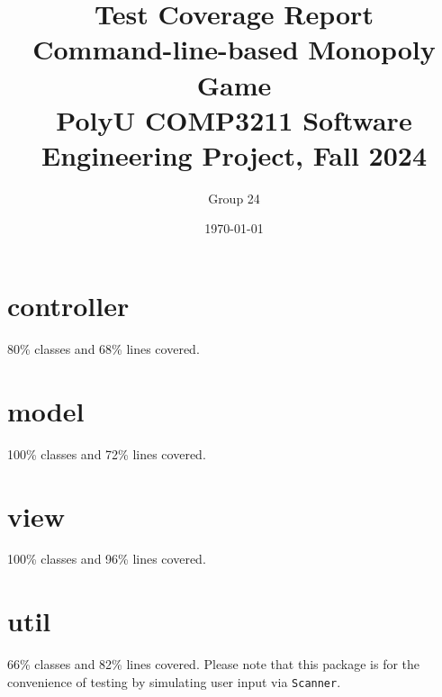 \documentclass{article}
\title{\textbf{Test Coverage Report} \\ {\textbf{Command-line-based Monopoly Game}}\\ {\large PolyU COMP3211 Software Engineering Project, Fall 2024}}
\author{\large Group 24}
\date{\today}
\begin{document}
\maketitle{}

\section{controller} 80\% classes and 68\% lines covered.
\section{model} 100\% classes and 72\% lines covered.
\section{view} 100\% classes and 96\% lines covered.
\section{util} 66\% classes and 82\% lines covered. Please note that this package is for the convenience of testing by simulating user input via \texttt{Scanner}.
\end{document}

